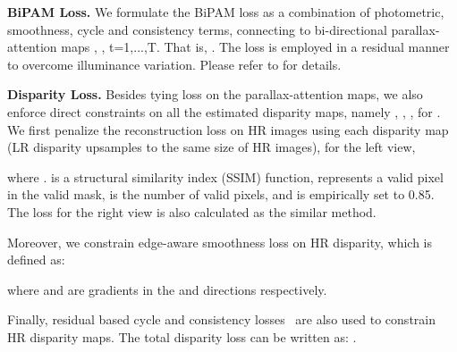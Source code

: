 \documentclass[sigconf]{acmart}
\begin{document}
\textbf{BiPAM Loss.}
We formulate the BiPAM loss as a combination of photometric, smoothness, cycle and consistency terms, connecting to bi-directional parallax-attention maps , , t=1,...,T. That is, . The loss is employed in a residual manner~\cite{Wang2020SymmetricPA} to overcome illuminance variation. Please refer to \cite{Wang2020SymmetricPA} for details.

\textbf{Disparity Loss.}
Besides tying loss on the parallax-attention maps, we also enforce direct constraints on all the estimated disparity maps, namely , , ,  for . We first penalize the reconstruction loss on HR images using each disparity map (LR disparity upsamples to the same size of HR images), for the left view, 

where .  is a structural similarity index (SSIM) function,  represents a valid pixel in the valid mask,  is the number of valid pixels, and  is empirically set to 0.85. The loss for the right view is also calculated as the similar method.

Moreover, we constrain edge-aware smoothness loss on HR disparity, which is defined as: 

where  and  are gradients in the  and  directions respectively.

Finally, residual based cycle and consistency losses~\cite{Wang2020SymmetricPA} are also used to constrain HR disparity maps. The total disparity loss can be written as: .
\end{document}
